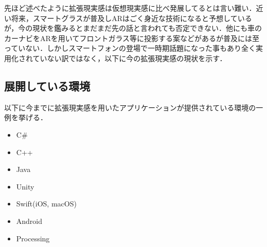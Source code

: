 先ほど述べたように拡張現実感は仮想現実感に比べ発展してるとは言い難い．近い将来，スマートグラス\cite{SG}が普及しARはごく身近な技術になると予想しているが，今の現状を鑑みるとまだまだ先の話と言われても否定できない．他にも車のカーナビをARを用いてフロントガラス等に投影する案\cite{ARnavi}などがあるが普及には至っていない．しかしスマートフォンの登場で一時期話題になった事もあり全く実用化されていない訳ではなく，以下に今の拡張現実感の現状を示す．

\vspace{5pt}
\subsection{展開している環境}
以下に今までに拡張現実感を用いたアプリケーションが提供されている環境の一例を挙げる．
\vspace{5pt}
\begin{itemize}
 \item C\#
 \item C++
 \item Java
 \item Unity
 \item Swift(iOS, macOS)
 \item Android
 \item Processing
\end{itemize}
\vspace{5pt}

